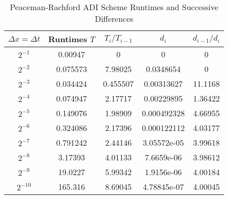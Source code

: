 \documentclass[12pt]{article}
\begin{document}
\begin{enumerate}[(a)]
\begin{table}[H]
\caption{Peaceman-Rachford ADI Scheme Runtimes and Successive Differences}
\centering\begin{tabular}{||c|cc|cc||}
\hline \hline
   $\Delta x = \Delta t$ &    Runtimes $T$ &   $T_{i}/T_{i-1}$ &  $d_i$ &   $d_{i-1}/d_{i}$ \\
\hline
                $2^{-1}$         &   0.00947  &         0        &              0           &             0       \\
                $2^{-2}$       &   0.075573 &         7.98025  &              0.0348654   &             0       \\
                $2^{-3}$      &   0.034424 &         0.455507 &              0.00313627  &            11.1168  \\
                $2^{-4}$     &   0.074947 &         2.17717  &              0.00229895  &             1.36422 \\
               $2^{-5}$   &   0.149076 &         1.98909  &              0.000492328 &             4.66955 \\
               $2^{-6}$    &   0.324086 &         2.17396  &              0.000122112 &             4.03177 \\
               $2^{-7}$  &   0.791242 &         2.44146  &              3.05572e-05 &             3.99618 \\
               $2^{-8}$  &   3.17393  &         4.01133  &              7.6659e-06  &             3.98612 \\
            $2^{-9}$ &  19.0227   &         5.99342  &              1.9156e-06  &             4.00184 \\
                $2^{-10}$ & 165.316    &         8.69045  &              4.78845e-07 &             4.00045 \\
\hline \hline
\end{tabular}
\end{table}


\end{enumerate}
\end{document}
